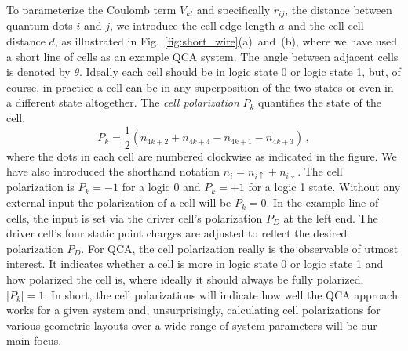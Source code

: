 To parameterize the Coulomb term $V_{kl}$ and specifically $r_{ij}$, the
distance between quantum dots $i$ and $j$, we introduce the cell edge length $a$
and the cell-cell distance $d$, as illustrated in
Fig.~\ref{fig:short_wire}(a)~and~(b), where we have used a short line of cells
as an example QCA system. The angle between adjacent cells is denoted by
$\theta$. Ideally each cell should be in logic state 0 or logic state 1, but,
of course, in practice a cell can be in any superposition of the two states or
even in a different state altogether. The \emph{cell polarization} $P_k$
quantifies the state of the cell,
\begin{equation}
  \label{eq:polarization}
  P_k = \frac{1}{2} \left( n_{4k+2} + n_{4k+4} - n_{4k+1} - n_{4k+3} \right) \, ,
\end{equation}
where the dots in each cell are numbered clockwise as indicated in the figure.
We have also introduced the shorthand notation $n_i = n_{i\uparrow} +
n_{i\downarrow}$. The cell polarization is $P_k = -1$ for a logic 0 and $P_k =
+1$ for a logic 1 state. Without any external input the polarization of a cell
will be $P_k = 0$. In the example line of cells, the input is set via the
driver cell's polarization $P_D$ at the left end. The driver cell's four static
point charges are adjusted to reflect the desired polarization $P_D$. For QCA,
the cell polarization really is the observable of utmost interest. It indicates
whether a cell is more in logic state 0 or logic state 1 and how polarized the
cell is, where ideally it should always be fully polarized, $|P_k| = 1$. In
short, the cell polarizations will indicate how well the QCA approach works for
a given system and, unsurprisingly, calculating cell polarizations for various
geometric layouts over a wide range of system parameters will be our main focus.

